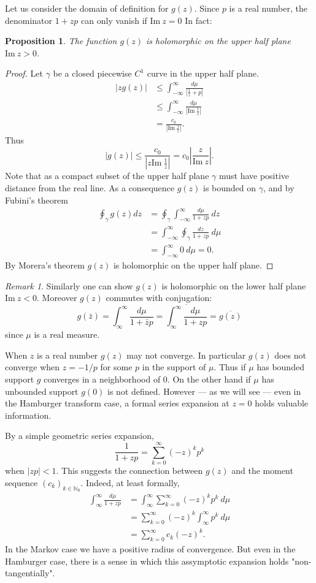 \documentclass{amsart}
\newtheorem{proposition}[theorem]{Proposition}
\theoremstyle{remark}
\newtheorem{remark}[theorem]{Remark}
\numberwithin{equation}{section}
\newcommand{\NN}{\mathbb{N}}
\newcommand{\im}{\text{Im}~}
\begin{document}
Let us consider the domain of definition for $g(z)$. Since $p$ is a real number, the denominator $1 + zp$ can only vanish if $\im z = 0$ In fact:
\begin{proposition}
The function $g(z)$ is holomorphic on the upper half plane $\im z > 0$.
\end{proposition}
\begin{proof}
Let $\gamma$ be a closed piecewise $C^1$ curve in the upper half plane. 
\begin{align*}
    |zg(z)| 
    &\leq \int_{-\infty}^\infty \frac{d\mu}{|\frac1z + p|} \\
    &\leq \int_{-\infty}^\infty \frac{d\mu}{|\im \frac1z|} \\
    &= \frac{c_0}{|\im \frac1z|}.
\end{align*}
Thus
\[
    |g(z)| \leq \frac{c_0}{|z \im \frac1z|} = c_0\left|\frac{z}{\im z}\right|.
\]
Note that as a compact subset of the upper half plane $\gamma$ must have positive distance from the real line. As a consequence $g(z)$ is bounded on $\gamma$, and by Fubini's theorem
\begin{align*}
    \oint_\gamma g(z) dz
    &= \oint_\gamma \int_{-\infty}^\infty \frac{d\mu}{1 + zp} ~dz \\
    &= \int_{-\infty}^\infty \oint_\gamma \frac{dz}{1 + zp} ~d\mu \\
    &= \int_{-\infty}^\infty 0 ~d\mu = 0.
\end{align*}
By Morera's theorem $g(z)$ is holomorphic on the upper half plane.
\end{proof}

\begin{remark}
Similarly one can show $g(z)$ is holomorphic on the lower half plane $\im z < 0$. Moreover $g(z)$ commutes with conjugation:
\[
    g(\bar z) = \int_\infty^\infty\frac{d\mu}{1+\bar zp} = \overline{\int_\infty^\infty\frac{d\mu}{1+zp}} = \overline{g(z)}
\]
since $\mu$ is a real measure.
\end{remark}


When $z$ is a real number $g(z)$ may not converge. In particular $g(z)$ does not converge when $z = -1/p$ for some $p$ in the support of $\mu$. Thus if $\mu$ has bounded support $g$ converges in a neighborhood of $0$. On the other hand if $\mu$ has unbounded support $g(0)$ is not defined. However — as we will see — even in the Hamburger transform case, a formal series expansion at $z = 0$ holds valuable information.

By a simple geometric series expansion,
\[
    \frac1{1 + zp} = \sum_{k = 0}^\infty (-z)^kp^k 
\]
when $|zp| < 1$. This suggests the connection between $g(z)$ and the moment sequence $(c_k)_{k \in \NN_0}$. Indeed, at least formally,
\begin{align*}
    \int_\infty^\infty\frac{d\mu}{1+zp}
    &= \int_\infty^\infty \sum_{k = 0}^\infty (-z)^kp^k ~d\mu \\
    &= \sum_{k = 0}^\infty (-z)^k \int_\infty^\infty p^k ~d\mu \\
    &= \sum_{k = 0}^\infty c_k(-z)^k.
\end{align*}
In the Markov case we have a positive radius of convergence. But even in the Hamburger case, there is a sense in which this assymptotic expansion holds "non-tangentially".
\end{document}
